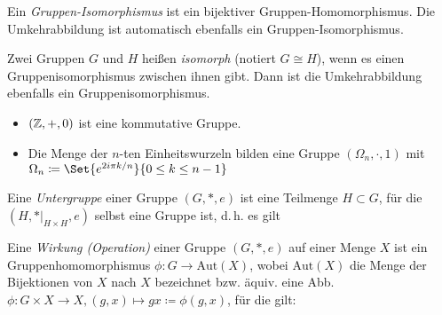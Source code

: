 \documentclass{cheat-sheet}
\begin{document}
\begin{defn}
  Ein \emph{Gruppen-Isomorphismus} ist ein bijektiver Gruppen-Homomorphismus. Die Umkehrabbildung ist automatisch ebenfalls ein Gruppen-Isomorphismus.
\end{defn}

\begin{defn}
  Zwei Gruppen $G$ und $H$ heißen \emph{isomorph} (notiert $G \cong H$), wenn es einen Gruppenisomorphismus zwischen ihnen gibt. Dann ist die Umkehrabbildung ebenfalls ein Gruppenisomorphismus.
\end{defn}

\begin{bspe}
  \begin{itemize}
    \item $(\mathbb{Z}, +, 0)$ ist eine kommutative Gruppe.
    \item Die Menge der $n$-ten Einheitswurzeln bilden eine Gruppe $(\Omega_n, \cdot, 1)$ mit $\Omega_n \coloneqq \Set{ e^{2i \pi k/n} }{ 0 \leq k \leq n - 1 }$
  \end{itemize}
\end{bspe}

\begin{defn}
  Eine \emph{Untergruppe} einer Gruppe $(G, *, e)$ ist eine Teilmenge $H \subset G$, für die $(H, *|_{H \times H}, e)$ selbst eine Gruppe ist, d.\,h. es gilt
  \begin{itemize}
  \end{itemize}
\end{defn}



\begin{defn}
  Eine \emph{Wirkung (Operation)} einer Gruppe $(G, *, e)$ auf einer Menge $X$ ist ein Gruppenhomomorphismus $\phi : G \to \mathrm{Aut}(X)$, wobei $\mathrm{Aut}(X)$ die Menge der Bijektionen von $X$ nach $X$ bezeichnet bzw. äquiv. eine Abb. $\phi : G \times X \to X, (g, x) \mapsto gx \coloneqq \phi(g, x)$, für die gilt:
  \begin{itemize}
  \end{itemize}
\end{defn}
\end{document}
